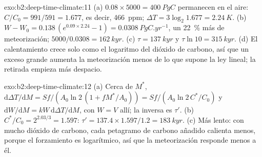 \begin{solution}{exo:b2:deep-time-climate:11}
(a) $0.08\times5000 = \qty{400}{PgC}$ permanecen en el aire: $C/C_0 = 991/591 = 1.677$, es decir,
\qty{466}{ppm}; $\Delta T = 3\log_2 1.677 = \qty{2.24}{K}$. (b) $W - W_0 = 0.138\,(e^{0.09\times2.24}
- 1) = \qty{0.0308}{PgC.yr^{-1}}$, un \qty{22}{\percent} más de meteorización; $5000/0.0308 =
\qty{162}{kyr}$. (c) $\tau = \qty{137}{kyr}$ y $\tau\ln10 = \qty{315}{kyr}$. (d) El calentamiento crece
solo como el logaritmo del dióxido de carbono, así que un exceso grande aumenta la meteorización menos de lo que
supone la ley lineal; la retirada empieza más despacio.
\end{solution}

\begin{solution}{exo:b2:deep-time-climate:12}
(a) Cerca de $M^*$, $\mathrm d\Delta T/\mathrm dM = Sf/(A_0\ln 2\,(1 + fM^*/A_0)) = Sf/(A_0\ln 2\,
C^*/C_0)$ y $\mathrm dW/\mathrm dM = kW\,\mathrm d\Delta T/\mathrm dM$, con $W = V$ allí; la
inversa es $\tau'$. (b) $C^*/C_0 = 2^{2.03/3} = 1.597$: $\tau' = 137.4\times1.597/1.2 =
\qty{183}{kyr}$. (c) Más lento: con mucho dióxido de carbono, cada petagramo de carbono añadido calienta menos,
porque el forzamiento es logarítmico, así que la meteorización responde menos a él.
\end{solution}

